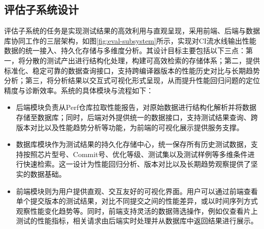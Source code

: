 \subsection{评估子系统设计}
评估子系统的任务是实现测试结果的高效利用与直观呈现，采用前端、后端与数据库协同工作的三层架构，如图\ref{fig:eval-subsystem}所示，实现对CI流水线输出性能数据的统一接入、持久化存储与多维度分析。其设计目标主要包括以下三点：第一，将分散的测试产出进行结构化处理，构建可高效检索的存储体系；第二，提供标准化、稳定可靠的数据查询接口，支持跨编译器版本的性能历史对比与长期趋势分析；第三，将分析结果以交互式可视化形式呈现，从而提升性能回归问题的定位精度与诊断效率。系统的具体模块与流程如下：

\begin{itemize}
	\item
	后端模块负责从Perf仓库拉取性能报告，对原始数据进行结构化解析并将数据存储至数据库；同时，后端对外提供统一的数据接口，支持测试结果查询、跨版本对比以及性能趋势分析等功能，为前端的可视化展示提供服务支撑。
	
	\item
	数据库模块作为测试结果的持久化存储中心，统一保存所有历史测试数据，支持按照芯片型号、Commit号、优化等级、测试集以及测试样例等多维条件进行快速检索。这一设计为性能回归分析、版本对比以及长期趋势观察提供了坚实的数据基础。
	
	\item
	前端模块则为用户提供直观、交互友好的可视化界面。用户可以通过前端查看单个提交版本的测试结果，对比不同提交之间的性能差异，或以时间序列方式观察性能变化趋势等。同时，前端支持灵活的数据筛选操作，例如仅查看片上测试的性能指标，相关请求由后端实时处理并从数据库中返回结果进行展示。
	
\end{itemize}

